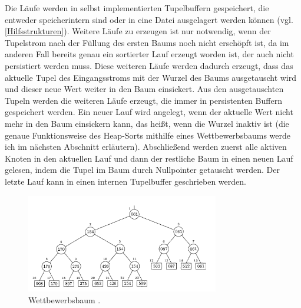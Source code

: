 \documentclass[a4paper,12pt,twoside]{article}
\begin{document}
Die Läufe werden in selbst implementierten Tupelbuffern gespeichert, die entweder speicherintern sind oder in eine Datei ausgelagert werden können (vgl. \autoref{Hilfsstrukturen}). Weitere Läufe zu erzeugen ist nur notwendig, wenn der Tupelstrom nach der Füllung des ersten Baums noch nicht erschöpft ist, da im anderen Fall bereits genau ein sortierter Lauf erzeugt worden ist, der auch nicht persistiert werden muss. Diese weiteren Läufe werden dadurch erzeugt, dass das aktuelle Tupel des Eingangsstroms mit der Wurzel des Baums ausgetauscht wird und dieser neue Wert weiter in den Baum einsickert. Aus den ausgetauschten Tupeln werden die weiteren Läufe erzeugt, die immer in persistenten Buffern gespeichert werden. Ein neuer Lauf wird angelegt, wenn der aktuelle Wert nicht mehr in den Baum einsickern kann, das heißt, wenn die Wurzel inaktiv ist (die genaue Funktionsweise des Heap-Sorts mithilfe eines Wettbewerbsbaums werde ich im nächsten Abschnitt erläutern). Abschließend werden zuerst alle aktiven Knoten in den aktuellen Lauf und dann der restliche Baum in einen neuen Lauf gelesen, indem die Tupel im Baum durch Nullpointer getauscht werden. Der letzte Lauf kann in einen internen Tupelbuffer geschrieben werden.

\begin{figure}
	\centering
	\includegraphics[width=0.75\textwidth]{Bilder/tournament.png}
	\caption{Wettbewerbsbaum \parencite[S. 253]{Knuth1973}.}
	\label{img:tournament}
\end{figure}
\end{document}
